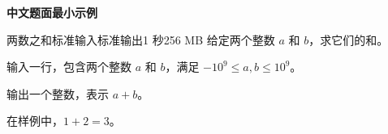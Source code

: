 \documentclass[11pt,a4paper,oneside]{article}
\begin{document}
\begin{center}
  {\LARGE\bfseries 中文题面最小示例}
\end{center}
\makeproblemtoc
\clearpage

\def\ProblemIndex{A}
\begin{problem}{两数之和}{标准输入}{标准输出}{1 秒}{256 MB}
给定两个整数 $a$ 和 $b$，求它们的和。

\InputFile
输入一行，包含两个整数 $a$ 和 $b$，满足 $-10^9 \le a,b \le 10^9$。

\OutputFile
输出一个整数，表示 $a+b$。

\Example
\begin{example}
%
\end{example}

\Note
在样例中，$1+2=3$。
\end{problem}
\end{document}
